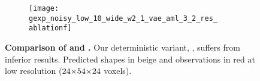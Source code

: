 \begin{figure}[tp]
{    \begin{subfigure}[t]{0.07\textwidth}
        \vspace{0px}\centering
        \texttt{[image: gexp\_noisy\_low\_10\_wide\_w2\_1\_vae\_aml\_3\_2\_res\_\\ablationf]}
    \end{subfigure}
    }
    \vspace*{-\figskipcaption px}
    \caption{{\bf Comparison of \AML and \dAML.} Our deterministic variant, \dAML, suffers from inferior results. Predicted shapes in {\color{rbeige}beige} and observations in {\color{rred}red} at low resolution ($24\operatorname*{\!\times\!}54\operatorname*{\!\times\!}24$ voxels).}
    \label{fig:results-shape-prior}
    \vspace*{-\figskipbelow px}
\end{figure}